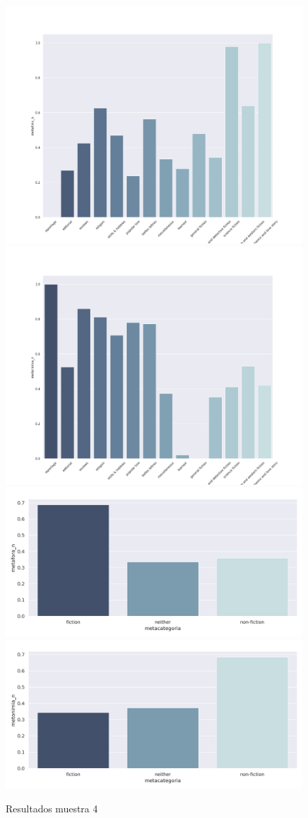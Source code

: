 \documentclass[twoside]{article}
\begin{document}
\begin{figure}[!H]
\centering
\includegraphics[width=.45\linewidth]{./resultados/graphs/muestra/c4_metafora.png}
\includegraphics[width=.45\linewidth]{./resultados/graphs/muestra/c4_metonimia.png}
\includegraphics[width=.45\linewidth]{./resultados/graphs/meta/c4_metacategoria_metafora.png}
\includegraphics[width=.45\linewidth]{./resultados/graphs/meta/c4_metacategoria_metonimia.png}
\caption{\label{fig:c4_resultados}Resultados muestra 4}
\end{figure}
\end{document}
